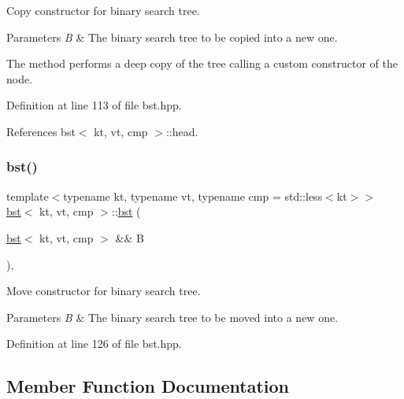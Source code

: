 Copy constructor for binary search tree. 


\begin{DoxyParams}{Parameters}
{\em B} & The binary search tree to be copied into a new one.\\
\hline
\end{DoxyParams}
The method performs a deep copy of the tree calling a custom constructor of the node. 

Definition at line 113 of file bst.\+hpp.



References bst$<$ kt, vt, cmp $>$\+::head.

\mbox{\label{classbst_ac0e8f8be6be76d77809ba1d21e1be66a}} 
\subsubsection{\texorpdfstring{bst()}{bst()}\hspace{0.1cm}{\footnotesize\ttfamily [3/3]}}
{\footnotesize\ttfamily template$<$typename kt, typename vt, typename cmp = std\+::less$<$kt$>$$>$ \\
\hyperlink{classbst}{bst}$<$ kt, vt, cmp $>$\+::\hyperlink{classbst}{bst} (\begin{DoxyParamCaption}\item[{\hyperlink{classbst}{bst}$<$ kt, vt, cmp $>$ \&\&}]{B }\end{DoxyParamCaption})\hspace{0.3cm}{\ttfamily [inline]}, {\ttfamily [noexcept]}}



Move constructor for binary search tree. 


\begin{DoxyParams}{Parameters}
{\em B} & The binary search tree to be moved into a new one. \\
\hline
\end{DoxyParams}


Definition at line 126 of file bst.\+hpp.



\subsection{Member Function Documentation}
\mbox{\label{classbst_a4ac74357616de45d5d3e7cbb9850854e}} 
